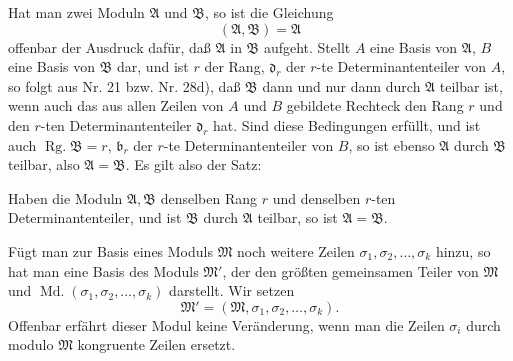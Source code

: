 \documentclass[11pt]{article}
\newcommand{\Rg}{\operatorname{Rg.}}
\newcommand{\Md}{\operatorname{Md.}}
\begin{document}
Hat man zwei Moduln $\mathfrak A$ und $\mathfrak B$, so ist die Gleichung
\[
(\mathfrak A,\mathfrak B)=\mathfrak A
\]
offenbar der Ausdruck dafür, daß $\mathfrak A$ in $\mathfrak B$ aufgeht. Stellt $A$ eine Basis von $\mathfrak A$, $B$ eine Basis von $\mathfrak B$ dar, und ist $r$ der Rang, $\mathfrak d_r$ der $r$-te Determinantenteiler von $A$, so folgt aus Nr. 21 bzw. Nr. 28d), daß $\mathfrak B$ dann und nur dann durch $\mathfrak A$ teilbar ist, wenn auch das aus allen Zeilen von $A$ und $B$ gebildete Rechteck den Rang $r$ und den $r$-ten Determinantenteiler $\mathfrak d_r$ hat. Sind diese Bedingungen erfüllt, und ist auch $\Rg\mathfrak B=r$, $\mathfrak b_r$ der $r$-te Determinantenteiler von $B$, so ist ebenso $\mathfrak A$ durch $\mathfrak B$ teilbar, also $\mathfrak A=\mathfrak B$. Es gilt also der Satz:

Haben die Moduln $\mathfrak A,\mathfrak B$ denselben Rang $r$ und denselben $r$-ten Determinantenteiler, und ist $\mathfrak B$ durch $\mathfrak A$ teilbar, so ist $\mathfrak A=\mathfrak B$.

Fügt man zur Basis eines Moduls $\mathfrak M$ noch weitere Zeilen $\sigma_1,\sigma_2,\ldots,\sigma_k$ hinzu, so hat man eine Basis des Moduls $\mathfrak M'$, der den größten gemeinsamen Teiler von $\mathfrak M$ und $\Md(\sigma_1,\sigma_2,\ldots,\sigma_k)$ darstellt. Wir setzen
\[
\mathfrak M'=(\mathfrak M,\sigma_1,\sigma_2,\ldots,\sigma_k).
\]
Offenbar erfährt dieser Modul keine Veränderung, wenn man die Zeilen $\sigma_i$ durch modulo $\mathfrak M$ kongruente Zeilen ersetzt.
\end{document}
